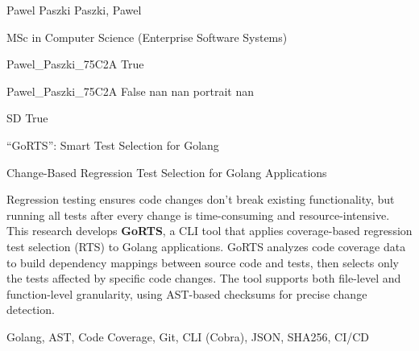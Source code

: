 \documentclass[twoside]{report}
\begin{document}
\begingroup{}\relax



\def\Key{Pawel_Paszki_75C2A}

{Pawel Paszki}
{Paszki, Pawel}

{MSc in Computer Science (Enterprise Software Systems)}

{Pawel_Paszki_75C2A}
{True}

{Pawel_Paszki_75C2A}
{False}
{nan}
{nan}
{portrait}
{nan}

{SD}
{True}

{\textquotedblleft{}GoRTS\textquotedblright{}: Smart Test Selection for Golang}

{Change-Based Regression Test Selection for Golang Applications}

{Regression testing ensures code changes don't break existing functionality, but running all tests after every change is time-consuming and resource-intensive. This research develops {\bfseries GoRTS}, a CLI tool that applies coverage-based regression test selection (RTS) to Golang applications. GoRTS analyzes code coverage data to build dependency mappings between source code and tests, then selects only the tests affected by specific code changes. The tool supports both file-level and function-level granularity, using AST-based checksums for precise change detection.}

{Golang, AST, Code Coverage, Git, CLI (Cobra), JSON, SHA256, CI/CD}
\end{document}
